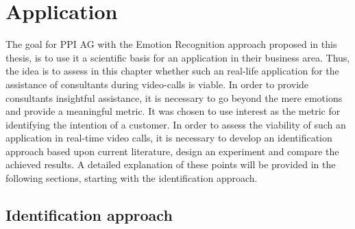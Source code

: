 
\chapter{Application}
The goal for PPI AG with the Emotion Recognition approach proposed in this thesis, is to use it a scientific basis for an application in their business area. Thus, the idea is to assess in this chapter whether such an real-life application for the assistance of consultants during video-calls is viable. In order to provide consultants insightful assistance, it is necessary to go beyond the mere emotions and provide a meaningful metric. It was chosen to use interest as the metric for identifying the intention of a customer.
\newline\newline
In order to assess the viability of such an application in real-time video calls, it is necessary to develop an identification approach based upon current literature, design an experiment and compare the achieved results. A detailed explanation of these points will be provided in the following sections, starting with the identification approach.

\section{Identification approach}

